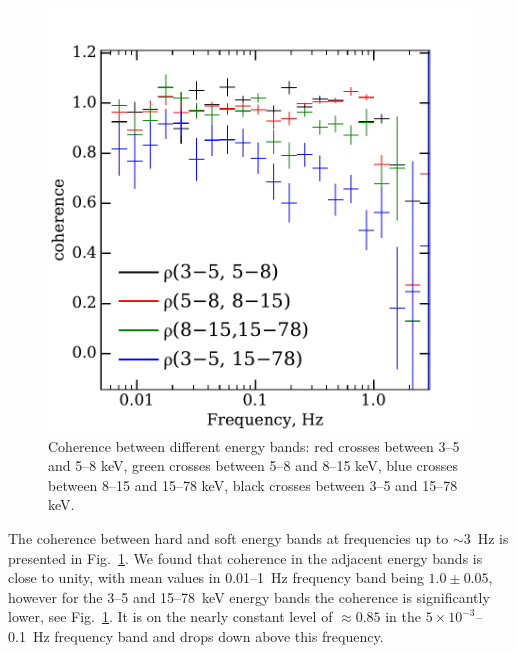 \documentclass[a4paper,fleqn,usenatbib]{mnras}
\begin{document}
\begin{figure}
    \includegraphics[width=\columnwidth]{coherence_4.pdf}
    \caption{Coherence between different energy bands:  red crosses between 3--5 and 5--8 keV,
     green crosses between 5--8 and 8--15 keV, blue crosses between 8--15 and 15--78 keV, black crosses between 3--5 and 15--78 keV.}
    \label{fig:coherence}
\end{figure}

The coherence between hard and soft energy bands at frequencies up to $\sim3$~Hz is presented in Fig.~\ref{fig:coherence}. 
We found that coherence in the adjacent energy bands is close to unity, with mean values in 0.01--1~Hz frequency band being $1.0\pm0.05$, however for the 3--5 and 15--78~keV energy bands the coherence is significantly lower, see Fig.~\ref{fig:coherence}. 
It is on the nearly constant level of $\approx0.85$ in the $5\times10^{-3}$--0.1~Hz frequency band and drops down above this frequency.
\end{document}

